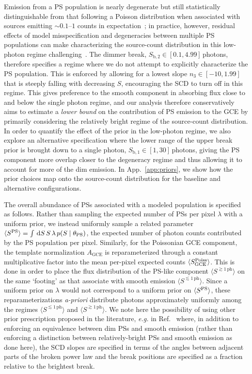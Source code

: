\documentclass[prd,aps,10pt,nofootinbib,twocolumn,superscriptaddress,preprintnumbers,balancelastpage,longbibliography,floatfix]{revtex4-2}
\begin{document}
Emission from a PS population is nearly degenerate but still statistically distinguishable from that following a Poisson distribution when associated with sources emitting $\sim 0.1$--$1$ counts in expectation~\cite{List:2021aer}; in practice, however, residual effects of model misspecification and degeneracies between multiple PS populations can make characterizing the source-count distribution in this low-photon regime challenging~\cite{Chang:2019ars}. The dimmer break, $S_{\mathrm{b}, 2} \in  [0.1, 4.99]$\,photons, therefore specifies a regime where we do not attempt to explicitly characterize the PS population. This is enforced by allowing for a lowest slope $n_3 \in [-10, 1.99]$ that is steeply falling with decreasing $S$, encouraging the SCD to turn off in this regime. This gives preference to the smooth component in absorbing flux close to and below the single photon regime, and our analysis therefore conservatively aims to estimate a \emph{lower bound} on the contribution of PS emission to the GCE by primarily considering the relatively bright regime of the source-count distribution. In order to quantify the effect of the prior in the low-photon regime, we also explore an alternative specification where the lower range of the upper break prior is brought down to a single photon, $S_{\mathrm{b}, 1}  \in  [1, 30]$\,photons, giving the PS component more overlap closer to the degeneracy regime and thus allowing it to account for more of the dim emission. In App.~\ref{app:priors}, we show how the prior choices map onto the source-count distribution for the baseline and alternative configurations.

The overall abundance of PSs associated with a modeled population is specified as follows. Rather than sampling the expected number of PSs per pixel $\lambda$ with a uniform prior, we instead uniformly sample a related parameter $\langle S^{\rm PS} \rangle = \int\,\mathrm{d} S\,S\,\lambda \, p(S\mid\theta_\mathrm{PS})$, the expected number of photon counts contributed by the PS population per pixel. Similarly, for the Poissonian GCE component, the template normalization $A_\mathrm{GCE}$ is reparameterized through a constant multiplicative factor into the mean per-pixel expected counts $\langle S^{\rm Poiss}_\mathrm{GCE} \rangle$. This is done in order to place the flux distribution of the PS-like component $\langle S^{\gtrsim 1\,\mathrm{ph}} \rangle$ on the same `footing' as that associate with smooth emission $\langle S^{\lesssim 1\,\mathrm{ph}} \rangle$. Since a uniform prior on $\lambda$ would not correspond to a uniform prior on $\langle S^{\rm PS} \rangle$, these reparameterizations \emph{a-priori} distribute photons approximately uniformly among the regimes $\langle S^{\lesssim 1\,\mathrm{ph}} \rangle$ and $\langle S^{\gtrsim 1\,\mathrm{ph}} \rangle$. We note here the possibility of using other prior prescription proposed in the literature, \emph{e.g.} in Ref.~\cite{Collin:2021ufc} where, in addition to enforcing an equivalence between dim PSs and smooth emission (rather than enforcing a distinction between relatively-bright PSs and smooth emission as done here), the SCD slopes are specified in terms of the angles between adjacent parts of the broken power law and the break positions are specified as a fraction relative to the brightest break.
\end{document}
